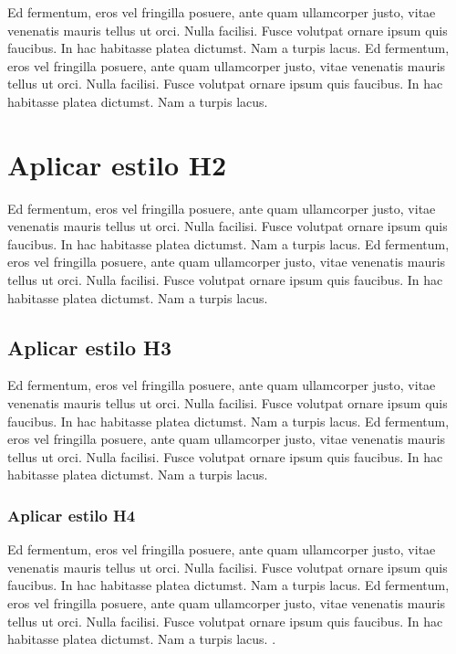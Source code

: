 \documentclass[10.5pt,17.35pt,a4paper]{article}
\begin{document}
Ed fermentum, eros vel fringilla posuere, ante quam ullamcorper justo, vitae venenatis mauris tellus ut orci. Nulla facilisi. Fusce volutpat ornare ipsum quis faucibus. In hac habitasse platea dictumst. Nam a turpis lacus. Ed fermentum, eros vel fringilla posuere, ante quam ullamcorper justo, vitae venenatis mauris tellus ut orci. Nulla facilisi. Fusce volutpat ornare ipsum quis faucibus. In hac habitasse platea dictumst. Nam a turpis lacus. 

\section{Aplicar estilo H2}

Ed fermentum, eros vel fringilla posuere, ante quam ullamcorper justo, vitae venenatis mauris tellus ut orci. Nulla facilisi. Fusce volutpat ornare ipsum quis faucibus. In hac habitasse platea dictumst. Nam a turpis lacus. Ed fermentum, eros vel fringilla posuere, ante quam ullamcorper justo, vitae venenatis mauris tellus ut orci. Nulla facilisi. Fusce volutpat ornare ipsum quis faucibus. In hac habitasse platea dictumst. Nam a turpis lacus. 

\subsection{Aplicar estilo H3}

Ed fermentum, eros vel fringilla posuere, ante quam ullamcorper justo, vitae venenatis mauris tellus ut orci. Nulla facilisi. Fusce volutpat ornare ipsum quis faucibus. In hac habitasse platea dictumst. Nam a turpis lacus. Ed fermentum, eros vel fringilla posuere, ante quam ullamcorper justo, vitae venenatis mauris tellus ut orci. Nulla facilisi. Fusce volutpat ornare ipsum quis faucibus. In hac habitasse platea dictumst. Nam a turpis lacus.

\subsubsection{Aplicar estilo H4}
 
Ed fermentum, eros vel fringilla posuere, ante quam ullamcorper justo, vitae venenatis mauris tellus ut orci. Nulla facilisi. Fusce volutpat ornare ipsum quis faucibus. In hac habitasse platea dictumst. Nam a turpis lacus. Ed fermentum, eros vel fringilla posuere, ante quam ullamcorper justo, vitae venenatis mauris tellus ut orci. Nulla facilisi. Fusce volutpat ornare ipsum quis faucibus. In hac habitasse platea dictumst. Nam a turpis lacus. \citep{Rajao2020, Staal2020}.
\newpage

\renewcommand{\refname}{Referências Bibliográficas}


\newpage


\finalpageamz

\end{document}

